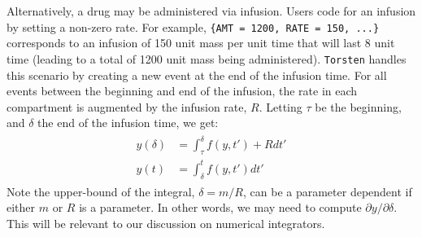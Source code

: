 \documentclass[11pt]{article}
\begin{document}
Alternatively, a drug may be administered via infusion.
Users code for an infusion by setting a non-zero rate. For example, 
\hbox{\texttt{\{AMT = 1200, RATE = 150, ...\}}} corresponds to an infusion of 150 unit mass per unit
time that will last 8 unit time (leading to a total of 1200 unit mass being administered). \texttt{Torsten} handles
this scenario by creating a new event at the end of the infusion time. For all events between the
beginning and end of the infusion, the rate in each compartment is augmented by the infusion rate,
$R$. Letting $\tau$ be the beginning, and $\delta$ the end of the infusion time, we get:
%
\begin{eqnarray}
  \begin{aligned}
  y(\delta) &= \int_\tau ^ \delta f(y, t') + R dt' \\
  y(t) &= \int_\delta ^ t f(y, t') dt'
  \end{aligned}
\end{eqnarray}
%
Note the upper-bound of the integral, $\delta = m / R$, can be a parameter dependent if either $m$ or
$R$ is a parameter. In other words, we may need to compute $\partial y / \partial \delta$. This will
be relevant to our discussion on numerical integrators.
\end{document}
